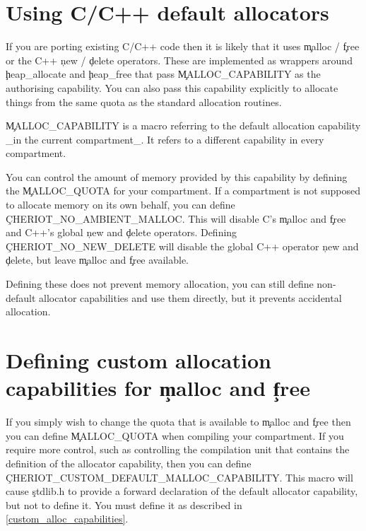 
\section{Using C/C++ default allocators}

If you are porting existing C/C++ code then it is likely that it uses \c{malloc} / \c{free} or the C++ \c{new} / \c{delete} operators.
These are implemented as wrappers around \c{heap_allocate} and \c{heap_free} that pass \c{MALLOC_CAPABILITY} as the authorising capability.
You can also pass this capability explicitly to allocate things from the same quota as the standard allocation routines.

\begin{note}
	\c{MALLOC_CAPABILITY} is a macro referring to the default allocation capability _in the current compartment_.
	It refers to a different capability in every compartment.
\end{note}

You can control the amount of memory provided by this capability by defining the \c{MALLOC_QUOTA} for your compartment.
If a compartment is not supposed to allocate memory on its own behalf, you can define \c{CHERIOT_NO_AMBIENT_MALLOC}.
This will disable C's \c{malloc} and \c{free} and C++'s global \c{new} and \c{delete} operators.
Defining \c{CHERIOT_NO_NEW_DELETE} will disable the global C++ operator \c{new} and \c{delete}, but leave \c{malloc} and \c{free} available.

Defining these does not prevent memory allocation, you can still define non-default allocator capabilities and use them directly, but it prevents accidental allocation.

\section{Defining custom allocation capabilities for \c{malloc} and \c{free}}

If you simply wish to change the quota that is available to \c{malloc} and \c{free} then you can define \c{MALLOC_QUOTA} when compiling your compartment.
If you require more control, such as controlling the compilation unit that contains the definition of the allocator capability, then you can define \c{CHERIOT_CUSTOM_DEFAULT_MALLOC_CAPABILITY}.
This macro will cause \c{stdlib.h} to provide a forward declaration of the default allocator capability, but not to define it.
You must define it as described in \ref{custom_alloc_capabilities}.

